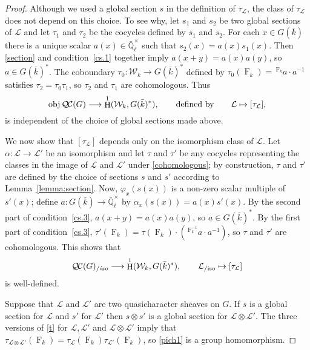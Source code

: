 \documentclass[11pt]{amsart}
\theoremstyle{plain}
\theoremstyle{definition}
\theoremstyle{remark}
\newcommand{\EE}{\mathbb{\bar Q}_\ell}
\newcommand{\bFq}{\bar{k}}
\newcommand{\Fq}{k}
\newcommand{\EEx}{\EE^\times}
\newcommand{\Frob}[1]{\operatorname{F}_{#1}}
\DeclareMathOperator{\Hh}{H}
\newcommand{\obj}{{\text{obj}\, }}
\newcommand{\qcs}[1]{{\mathcal{#1}}}
\newcommand{\QC}{{\mathcal{Q\hskip-0.8pt C}}}
\newcommand{\QCiso}[1]{\QC(#1)_{/\textit{iso}}}
\newcommand{\Weil}[1]{\mathcal{W}_{#1}}
\newcommand\Clifton[1]{\marginpar{\smaller\smaller CC: #1}}
\begin{document}
\begin{proof}
  Although we used a global section $s$ in the definition of
  $\tau_\qcs{L}$, the class of $\tau_\qcs{L}$ does not depend on this
  choice. To see why, let $s_1$ and $s_2$ be two global sections of
  $\qcs{L}$ and let $\tau_1$ and $\tau_2$ be the cocycles defined by $s_1$ and $s_2$.
  For each $x \in G(\bFq)$ there is a unique scalar
  $a(x) \in \EEx$ such that $s_2(x) = a(x) s_1(x)$. Then \eqref{section} and
  condition~\ref{cs.1} together imply $a(x+y) = a(x)a(y)$, so
  $a\in G(\bFq)^*$.  The coboundary $\tau_0 : \Weil{\Fq} \to G(\bFq)^*$
  defined by $\tau_0(\Frob{\Fq}) = \,^{\Frob{\Fq}} a \cdot a^{-1}$ satisfies $\tau_2 = \tau_0 \tau_1$,
  so $\tau_2$ and $\tau_1$ are cohomologous. Thus
  \begin{equation}\label{cohomologous}
    \obj \QC(G) \longrightarrow \Hh^1(\Weil{\Fq},G(\bFq)^*),
    \qquad \text{defined by} \qquad \qcs{L} \mapsto [\tau_\qcs{L}],
  \end{equation}
  is independent of the choice of global sections made above.

  We now show that $[\tau_\qcs{L}]$ depends only on the isomorphism class of $\qcs{L}$.
  Let $\alpha : \qcs{L} \to \qcs{L'}$ be an isomorphism and
  let $\tau$ and $\tau'$ be any cocycles representing the classes in the
  image of $\qcs{L}$ and $\qcs{L'}$ under \eqref{cohomologous}; by construction,
  $\tau$ and $\tau'$ are defined by the choice of sections $s$ and $s'$ 
  according to Lemma~\ref{lemma:section}.
    Now, $\varphi_x(s(x))$ is a
  non-zero scalar multiple of $s'(x)$; define $a: G(\bFq) \to \EEx$
  by $\alpha_x(s(x)) = a(x) s'(x)$.
  By the second part of condition~\ref{cs.3},
  $a(x+y) = a(x)a(y)$, so $a \in G(\bFq)^*$. By the first part of
  condition~\ref{cs.3}, $\tau'(\Frob{\Fq}) = \tau(\Frob{\Fq}) \cdot (\,^{\Frob{\Fq}^{-1}}a \cdot a^{-1})$,
  so $\tau$ and $\tau'$ are cohomologous. This shows that
  \begin{equation}\label{pich1}
    \QCiso{G} \longrightarrow \Hh^1(\Weil{\Fq},G(\bFq)^*), \qquad \qcs{L}_{/\text{iso}} \mapsto [\tau_\qcs{L}]
  \end{equation}
  is well-defined.
  
    Suppose that $\qcs{L}$ and $\qcs{L}'$ are two quasicharacter sheaves on $G$.
  If $s$ is a global section for $\qcs{L}$ and $s'$ for $\qcs{L}'$ then $s \otimes s'$
  is a global section for $\qcs{L} \otimes\qcs{L}'$.  The three versions of \eqref{t}
  for $\qcs{L}, \qcs{L'}$ and $\qcs{L} \otimes\qcs{L}'$ imply that
  $\tau_{\qcs{L} \otimes\qcs{L}'}(\Frob{k}) = \tau_\qcs{L}(\Frob{k}) \tau_{\qcs{L}'}(\Frob{k})$,
  so \eqref{pich1} is a group homomorphism.
 

\end{proof}
\end{document}
